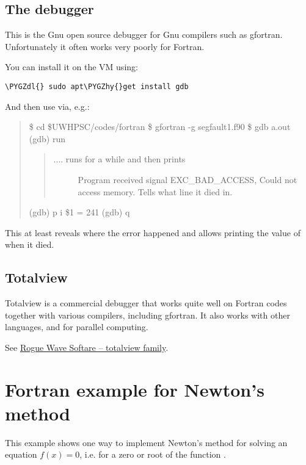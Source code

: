 \documentclass[letterpaper,10pt,english]{sphinxmanual}
\def\PYGZdl{\char`\$}
\def\PYGZhy{\char`\-}
\begin{document}
\subsection{The  debugger}
\label{fortran_debugging:the-gdb-debugger}
This is the Gnu open source debugger for Gnu compilers such as gfortran.
Unfortunately it often works very poorly for Fortran.

You can install it on the VM using:

\begin{Verbatim}[commandchars=\\\{\}]
\PYGZdl{} sudo apt\PYGZhy{}get install gdb
\end{Verbatim}

And then use via, e.g.:
\begin{quote}

\$ cd \$UWHPSC/codes/fortran
\$ gfortran -g segfault1.f90
\$ gdb a.out
(gdb) run
\begin{quote}
\begin{description}
\item[{.... runs for a while and then prints}] \leavevmode
Program received signal EXC\_BAD\_ACCESS, Could not access memory.
Tells what line it died in.

\end{description}
\end{quote}

(gdb) p i
\$1 = 241
(gdb) q
\end{quote}

This at least reveals where the error happened and allows printing the value
of  when it died.


\subsection{Totalview}
\label{fortran_debugging:totalview}
Totalview is a commercial debugger that works quite well on Fortran codes
together with various compilers, including gfortran.  It also works with
other languages, and for parallel computing.

See \href{http://www.roguewave.com/products/totalview-family.aspx}{Rogue Wave Softare -- totalview family}.


\section{Fortran example for Newton's method}
\label{fortran_newton:fortran-newton}\label{fortran_newton:fortran-example-for-newton-s-method}\label{fortran_newton::doc}
This example shows one way to implement Newton's method for solving an
equation \(f(x)=0\), i.e. for a zero or root of the function .
\end{document}
